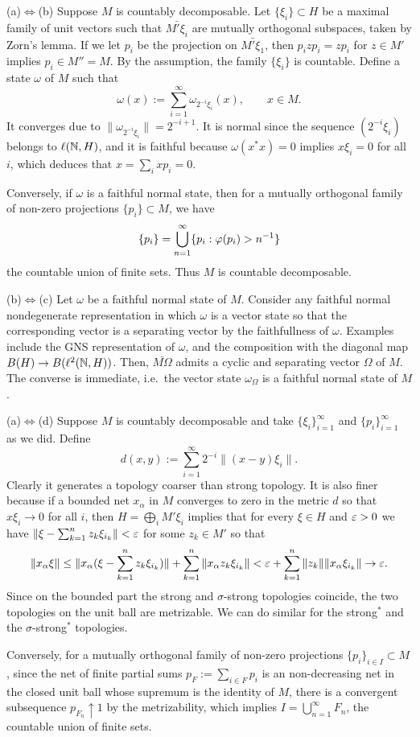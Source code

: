 \documentclass{../../small}
\begin{document}
\begin{pf}
(a)$\Leftrightarrow$(b)
Suppose $M$ is countably decomposable.
Let $\{\xi_i\}\subset H$ be a maximal family of unit vectors such that $\bar{M'\xi_i}$ are mutually orthogonal subspaces, taken by Zorn's lemma.
If we let $p_i$ be the projection on $\bar{M'\xi_1}$, then $p_izp_i=zp_i$ for $z\in M'$ implies $p_i\in M''=M$.
By the assumption, the family $\{\xi_i\}$ is countable.
Define a state $\omega$ of $M$ such that
\[\omega(x):=\sum_{i=1}^\infty\omega_{2^{-i}\xi_i}(x),\qquad x\in M.\]
It converges due to $\|\omega_{2^{-i}\xi_i}\|=2^{-i+1}$.
It is normal since the sequence $(2^{-i}\xi_i)$ belongs to $\ell(\mathbb{N},H)$, and it is faithful because $\omega(x^*x)=0$ implies $x\xi_i=0$ for all $i$, which deduces that $x=\sum_ixp_i=0$.

Conversely, if $\omega$ is a faithful normal state, then for a mutually orthogonal family of non-zero projections $\{p_i\}\subset M$, we have
\[\{p_i\}=\bigcup_{n=1}^\infty\{p_i:\varphi(p_i)>n^{-1}\}\]
the countable union of finite sets.
Thus $M$ is countable decomposable.

(b)$\Leftrightarrow$(c)
Let $\omega$ be a faithful normal state of $M$.
Consider any faithful normal nondegenerate representation in which $\omega$ is a vector state so that the corresponding vector is a separating vector by the faithfullness of $\omega$.
Examples include the GNS representation of $\omega$, and the composition with the diagonal map $B(H)\to B(\ell^2(\mathbb{N},H))$.
Then, $\bar{M\Omega}$ admits a cyclic and separating vector $\Omega$ of $M$.
The converse is immediate, i.e.~the vector state $\omega_\Omega$ is a faithful normal state of $M$.

(a)$\Leftrightarrow$(d)
Suppose $M$ is countably decomposable and take $\{\xi_i\}_{i=1}^\infty$ and $\{p_i\}_{i=1}^\infty$ as we did.
Define
\[d(x,y):=\sum_{i=1}^\infty2^{-i}\|(x-y)\xi_i\|.\]
Clearly it generates a topology coarser than strong topology.
It is also finer because if a bounded net $x_\alpha$ in $M$ converges to zero in the metric $d$ so that $x\xi_i\to0$ for all $i$, then $H=\bigoplus_iM'\xi_i$ implies that for every $\xi\in H$ and $\varepsilon>0$ we have $\|\xi-\sum_{k=1}^nz_k\xi_{i_k}\|<\varepsilon$ for some $z_k\in M'$ so that
\[\|x_\alpha\xi\|\le\|x_\alpha(\xi-\sum_{k=1}^nz_k\xi_{i_k})\|+\sum_{k=1}^n\|x_\alpha z_k\xi_{i_k}\|<\varepsilon+\sum_{k=1}^n\|z_k\|\|x_\alpha\xi_{i_k}\|\to\varepsilon.\]
Since on the bounded part the strong and $\sigma$-strong topologies coincide, the two topologies on the unit ball are metrizable.
We can do similar for the strong$^*$ and the $\sigma$-strong$^*$ topologies.

Conversely, for a mutually orthogonal family of non-zero projections $\{p_i\}_{i\in I}\subset M$, since the net of finite partial sums $p_F:=\sum_{i\in F}p_i$ is an non-decreasing net in the closed unit ball whose supremum is the identity of $M$, there is a convergent subsequence $p_{F_n}\uparrow1$ by the metrizability, which implies $I=\bigcup_{n=1}^\infty F_n$, the countable union of finite sets.
\end{pf}
\end{document}
